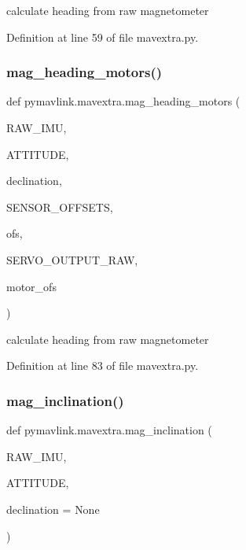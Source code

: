 \begin{DoxyVerb}calculate heading from raw magnetometer\end{DoxyVerb}
 

Definition at line 59 of file mavextra.\+py.

\mbox{\label{namespacepymavlink_1_1mavextra_aed3e1ad61d9f219e180e9e3ac94764fe}} 
\subsubsection{\texorpdfstring{mag\_heading\_motors()}{mag\_heading\_motors()}}
{\footnotesize\ttfamily def pymavlink.\+mavextra.\+mag\+\_\+heading\+\_\+motors (\begin{DoxyParamCaption}\item[{}]{R\+A\+W\+\_\+\+I\+MU,  }\item[{}]{A\+T\+T\+I\+T\+U\+DE,  }\item[{}]{declination,  }\item[{}]{S\+E\+N\+S\+O\+R\+\_\+\+O\+F\+F\+S\+E\+TS,  }\item[{}]{ofs,  }\item[{}]{S\+E\+R\+V\+O\+\_\+\+O\+U\+T\+P\+U\+T\+\_\+\+R\+AW,  }\item[{}]{motor\+\_\+ofs }\end{DoxyParamCaption})}

\begin{DoxyVerb}calculate heading from raw magnetometer\end{DoxyVerb}
 

Definition at line 83 of file mavextra.\+py.

\mbox{\label{namespacepymavlink_1_1mavextra_a38cfb9a7f119e04fd6abee84eaca3adc}} 
\subsubsection{\texorpdfstring{mag\_inclination()}{mag\_inclination()}}
{\footnotesize\ttfamily def pymavlink.\+mavextra.\+mag\+\_\+inclination (\begin{DoxyParamCaption}\item[{}]{R\+A\+W\+\_\+\+I\+MU,  }\item[{}]{A\+T\+T\+I\+T\+U\+DE,  }\item[{}]{declination = {\ttfamily None} }\end{DoxyParamCaption})}

